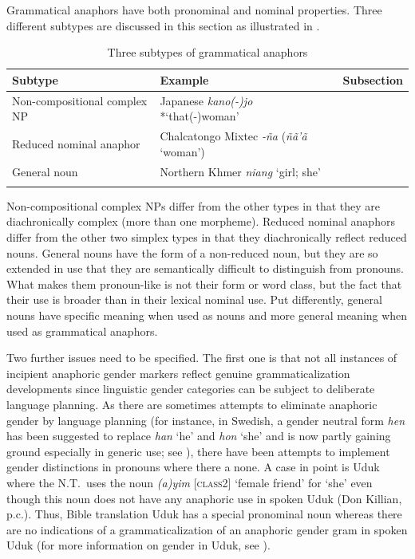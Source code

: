 \documentclass[output=collectionpaper]{langsci/langscibook}
\begin{document}
Grammatical anaphors have both pronominal and nominal properties. Three different subtypes are discussed in this section as illustrated in .

\begin{table}
\begin{tabularx}{\textwidth}{QQl}
\lsptoprule
Subtype	&	Example	&	Subsection	\\
\midrule
Non-compositional complex NP	&	Japanese \textit{kano(-)jo} *‘that(-)woman’	&		\\
Reduced nominal anaphor	&	Chalcatongo Mixtec \textit{-ña} (\textit{ñã’ã} ‘woman’)	&		\\
General noun	&	Northern Khmer \textit{niang} ‘girl; she’	&		\\
\lspbottomrule
\end{tabularx}
\caption{Three subtypes of grammatical anaphors}
\label{tab:BW:6}
\end{table}

Non-compositional complex NPs differ from the other types in that they are diachronically complex (more than one morpheme). Reduced nominal anaphors differ from the other two simplex types in that they diachronically reflect reduced nouns. General nouns have the form of a non-reduced noun, but they are so extended in use that they are semantically difficult to distinguish from pronouns. What makes them pronoun-like is not their form or word class, but the fact that their use is broader than in their lexical nominal use. Put differently, general nouns have specific meaning when used as nouns and more general meaning when used as grammatical anaphors.

Two further issues need to be specified. The first one is that not all instances of incipient anaphoric gender markers reflect genuine grammaticalization developments since linguistic gender categories can be subject to deliberate language planning. As there are sometimes attempts to eliminate anaphoric gender by language planning (for instance, in Swedish, a gender neutral form \textit{hen} has been suggested to replace \textit{han} ‘he’ and \textit{hon} ‘she’ and is now partly gaining ground especially in generic use; see \citealt[27]{Milles2011}), there have been attempts to implement gender distinctions in pronouns where there a none. A case in point is Uduk where the N.T.\ uses the noun \textit{(a)yim} [\textsc{class2}] ‘female friend’ for ‘she’ even though this noun does not have any anaphoric use in spoken Uduk (Don Killian, p.c.). Thus, Bible translation Uduk has a special pronominal noun whereas there are no indications of a grammaticalization of an anaphoric gender gram in spoken Uduk (for more information on gender in Uduk, see ).
\end{document}
